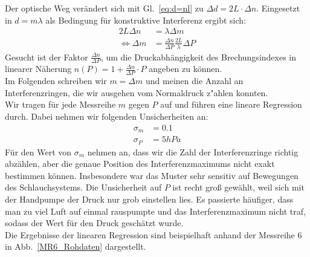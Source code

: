 \documentclass[12pt,a4paper]{article}
\begin{document}
Der optische Weg verändert sich mit Gl.~\eqref{eq:d=nl} zu $\Delta d=2L\cdot\Delta n$. Eingesetzt in $d=m\lambda$ als Bedingung für konstruktive Interferenz ergibt sich:
\begin{align}
2L\Delta n&=\lambda\Delta m\nonumber\\
\Leftrightarrow\Delta m&=\frac{\Delta n}{\Delta P}\frac{2L}{\lambda}\Delta P
\end{align}
Gesucht ist der Faktor $\frac{\Delta n}{\Delta P}$, um die Druckabhängigkeit des Brechungsindexes in linearer Näherung $n(P)=1+\frac{\Delta n}{\Delta P}\cdot P$ angeben zu können.\\
Im Folgenden schreiben wir $m=\Delta m$ und meinen die Anzahl an Interferenzringen, die wir ausgehen vom Normaldruck z"ahlen konnten.\\
Wir tragen für jede Messreihe $m$ gegen $P$ auf und führen eine lineare Regression durch. Dabei nehmen wir folgenden Unsicherheiten an:
\begin{align}
\sigma_{m}&=0.1\\
\sigma_{P}&=5hPa
\end{align}
Für den Wert von $\sigma_m$ nehmen an, dass wir die Zahl der Interferenzringe richtig abzählen, aber die genaue Position des Interferenzmaximums nicht exakt bestimmen können. Insbesondere war das Muster sehr sensitiv auf Bewegungen des Schlauchsystems. Die Unsicherheit auf $P$ ist recht groß gewählt, weil sich mit der Handpumpe der Druck nur grob einstellen lies. Es passierte häufiger, dass man zu viel Luft auf einmal rauspumpte und das Interferenzmaximum nicht traf, sodass der Wert für den Druck geschätzt wurde.\\
Die Ergebnisse der linearen Regression sind beispielhaft anhand der Messreihe 6 in Abb.~\ref{MR6_Rohdaten} dargestellt.
\end{document}
